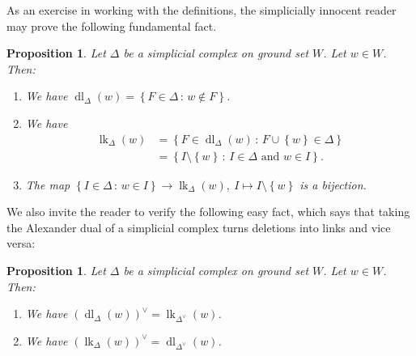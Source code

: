 \documentclass[12pt]{amsart}
\newtheorem{proposition}[theorem]{Proposition}
\theoremstyle{definition}
\newcommand{\with}{\,\colon\,}
\DeclareMathOperator{\lk}{lk}
\DeclareMathOperator{\dl}{dl}
\DeclareMathOperator{\st}{st}
\newcommand{\set}[1]{\left\{ #1 \right\}}
\begin{document}
As an exercise in working with the definitions, the simplicially innocent reader may prove the following fundamental fact.

\begin{proposition} \label{prop.star.basics}
Let $\Delta$ be a simplicial complex on ground set $W$.
Let $w \in W$. Then:

\begin{enumerate}



\item[(a)] We have $\dl_\Delta(w) = \set{F \in \Delta \with w \notin F}$.

\item[(b)] We have
\begin{align*}
\lk_\Delta(w)
&= \set{F \in \dl_\Delta(w) \with F \cup \set{w} \in \Delta } \\
&= \set{I \setminus \set{w} \with I \in \Delta \text{ and } w \in I }.
\end{align*}

\item[(c)] The map $\set{I \in \Delta \with w \in I} \to \lk_\Delta(w),\ I \mapsto I \setminus \set{w}$ is a bijection.

\end{enumerate}

\end{proposition}

We also invite the reader to verify the following easy fact, which says that
taking the Alexander dual of a simplicial complex turns deletions into links
and vice versa:

\begin{proposition}
\label{prop.dl-lk-dual}
Let $\Delta$ be a simplicial complex on ground set $W$.
Let $w\in W$. Then:

\begin{enumerate}
\item[(a)] We have $\left(  \dl_{\Delta}\left(  w\right)  \right)  ^{\vee
}=\lk_{\Delta^{\vee}}\left(  w\right)  $.

\item[(b)] We have $\left(  \lk_{\Delta}\left(  w\right)  \right)  ^{\vee
}=\dl_{\Delta^{\vee}}\left(  w\right)  $.
\end{enumerate}
\end{proposition}
\end{document}
